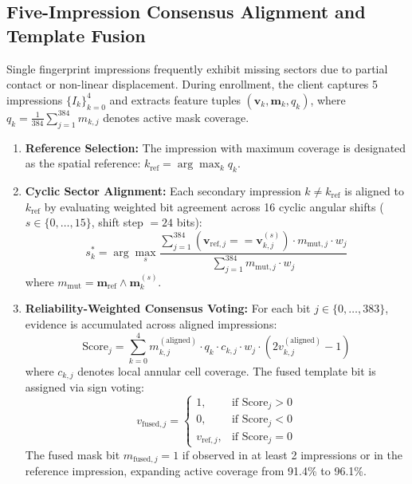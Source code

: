 \documentclass[conference]{IEEEtran}
\begin{document}
\subsection{Five-Impression Consensus Alignment and Template Fusion}
Single fingerprint impressions frequently exhibit missing sectors due to partial contact or non-linear displacement. During enrollment, the client captures 5 impressions $\{I_k\}_{k=0}^4$ and extracts feature tuples $(\mathbf{v}_k, \mathbf{m}_k, q_k)$, where $q_k = \frac{1}{384}\sum_{j=1}^{384} m_{k,j}$ denotes active mask coverage.
\begin{enumerate}
    \item \textbf{Reference Selection:} The impression with maximum coverage is designated as the spatial reference: $k_{\text{ref}} = \arg\max_k q_k$.
    \item \textbf{Cyclic Sector Alignment:} Each secondary impression $k \neq k_{\text{ref}}$ is aligned to $k_{\text{ref}}$ by evaluating weighted bit agreement across 16 cyclic angular shifts ($s \in \{0, \dots, 15\}$, shift step $= 24$ bits):
    \begin{equation}
    s^*_k = \arg\max_{s} \frac{\sum_{j=1}^{384} (\mathbf{v}_{\text{ref}, j} == \mathbf{v}^{(s)}_{k, j}) \cdot m_{\text{mut}, j} \cdot w_j}{\sum_{j=1}^{384} m_{\text{mut}, j} \cdot w_j}
    \end{equation}
    where $m_{\text{mut}} = \mathbf{m}_{\text{ref}} \land \mathbf{m}^{(s)}_k$.
    \item \textbf{Reliability-Weighted Consensus Voting:} For each bit $j \in \{0, \dots, 383\}$, evidence is accumulated across aligned impressions:
    \begin{equation}
    \text{Score}_j = \sum_{k=0}^4 m_{k,j}^{(\text{aligned})} \cdot q_k \cdot c_{k,j} \cdot w_j \cdot (2 v_{k,j}^{(\text{aligned})} - 1)
    \end{equation}
    where $c_{k,j}$ denotes local annular cell coverage. The fused template bit is assigned via sign voting:
    \begin{equation}
    v_{\text{fused}, j} = \begin{cases} 1, & \text{if } \text{Score}_j > 0 \\ 0, & \text{if } \text{Score}_j < 0 \\ v_{\text{ref}, j}, & \text{if } \text{Score}_j = 0 \end{cases}
    \end{equation}
    The fused mask bit $m_{\text{fused}, j} = 1$ if observed in at least 2 impressions or in the reference impression, expanding active coverage from 91.4\% to 96.1\%.
\end{enumerate}
\end{document}
